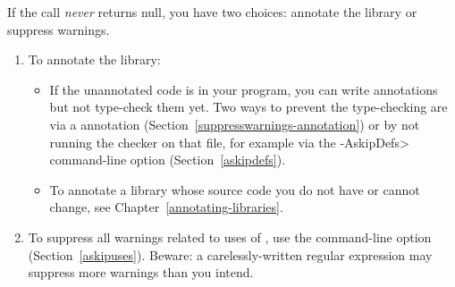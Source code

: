 If the call \emph{never} returns null, you have two choices:  annotate the library
or suppress warnings.
\begin{enumerate}
\item To annotate the library:
  \begin{itemize}
  \item
    If the unannotated code is in your program, you can write annotations
    but not type-check them yet.  Two ways to prevent the type-checking are
    via a  annotation
    (Section~\ref{suppresswarnings-annotation}) or by not running the
    checker on that file, for example via the \<-AskipDefs> command-line
    option (Section~\ref{askipdefs}).
  \item
    To annotate a library whose source code you do not have or cannot
    change, see Chapter~\ref{annotating-libraries}.
  \end{itemize}
\item To suppress all warnings related to uses of
  , use the  command-line option
  (Section~\ref{askipuses}).  Beware:  a carelessly-written regular
  expression may suppress more warnings than you intend.
\end{enumerate}


